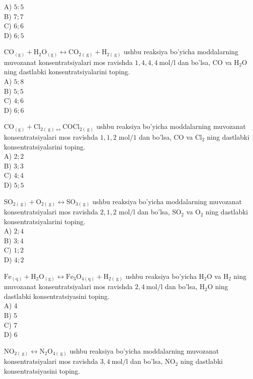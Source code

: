 A) $5: 5$\\
B) $7 ; 7$\\
C) $6 ; 6$\\
D) $6 ; 5$
  \item $\mathrm{CO}_{(\mathrm{g})}+\mathrm{H}_{2} \mathrm{O}_{(\mathrm{g})} \leftrightarrow \mathrm{CO}_{2(\mathrm{~g})}+\mathrm{H}_{2(\mathrm{~g})}$ ushbu reaksiya bo'yicha moddalarning muvozanat konsentratsiyalari mos ravishda $1,4,4,4 \mathrm{~mol} / \mathrm{l}$ dan bo'lsa, CO va $\mathrm{H}_{2} \mathrm{O}$ ning dastlabki konsentratsiyalarini toping.\\
A) $5 ; 8$\\
B) $5 ; 5$\\
C) $4 ; 6$\\
D) $6 ; 6$
  \item $\mathrm{CO}_{(\mathrm{g})}+\mathrm{Cl}_{2(\mathrm{~g}) \leftrightarrow} \mathrm{COCl}_{2(\mathrm{~g})}$ ushbu reaksiya bo'yicha moddalarning muvozanat konsentratsiyalari mos ravishda $1,1,2$ $\mathrm{mol} / 1$ dan bo'lsa, CO va $\mathrm{Cl}_{2}$ ning dastlabki konsentratsiyalarini toping.\\
A) $2 ; 2$\\
B) $3 ; 3$\\
C) $4 ; 4$\\
D) $5 ; 5$
  \item $\mathrm{SO}_{2(\mathrm{~g})}+\mathrm{O}_{2(\mathrm{~g})} \leftrightarrow \mathrm{SO}_{3(\mathrm{~g})}$ ushbu reaksiya bo'yicha moddalarning muvozanat konsentratsiyalari mos ravishda $2,1,2$ $\mathrm{mol} / \mathrm{l}$ dan bo'lsa, $\mathrm{SO}_{2}$ va $\mathrm{O}_{2}$ ning dastlabki konsentratsiyalarini toping.\\
A) $2 ; 4$\\
B) $3 ; 4$\\
C) $1 ; 2$\\
D) $4 ; 2$
  \item $\mathrm{Fe}_{(\mathrm{q})}+\mathrm{H}_{2} \mathrm{O}_{(\mathrm{g})} \leftrightarrow \mathrm{Fe}_{3} \mathrm{O}_{4(\mathrm{q})}+\mathrm{H}_{2(\mathrm{~g})}$ ushbu reaksiya bo'yicha $\mathrm{H}_{2} \mathrm{O}$ va $\mathrm{H}_{2}$ ning muvozanat konsentratsiyalari mos ravishda $2,4 \mathrm{~mol} / \mathrm{l}$ dan bo'lsa, $\mathrm{H}_{2} \mathrm{O}$ ning dastlabki konsentratsiyasini toping.\\
A) 4\\
B) 5\\
C) 7\\
D) 6
  \item $\mathrm{NO}_{2(\mathrm{~g})} \leftrightarrow \mathrm{N}_{2} \mathrm{O}_{4(\mathrm{~g})}$ ushbu reaksiya bo'yicha moddalarning muvozanat konsentratsiyalari mos ravishda $3,4 \mathrm{~mol} / \mathrm{l}$ dan bo'lsa, $\mathrm{NO}_{2}$ ning dastlabki konsentratsiyasini toping.\\
